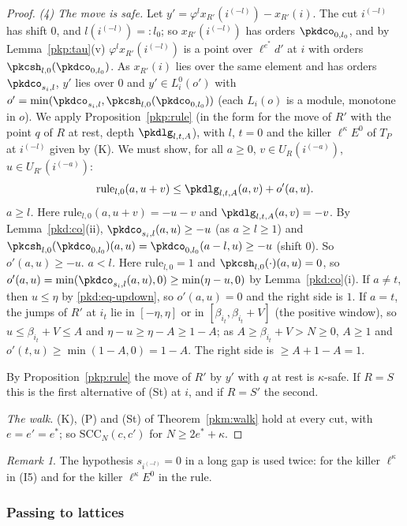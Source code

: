 \documentclass[10pt]{amsart}
\theoremstyle{definition}
\theoremstyle{remark}
\newtheorem{remark}[theorem]{Remark}
\begin{document}
\begin{proof}
\emph{(4) The move is safe.} Let $y'=\varphi^lx_{R'}(i^{(-l)})-x_{R'}(i)$. The cut $i^{(-l)}$ has shift
$0$, and $l(i^{(-l)})=:l_0$; so $x_{R'}(i^{(-l)})$ has orders $\pkdco_{0,l_0}$, and by
Lemma~\ref{pkp:tau}(v) $\varphi^lx_{R'}(i^{(-l)})$ is a point over $\ell^{e^*}d'$ at $i$ with orders
$\pkcsh_{l,0}(\pkdco_{0,l_0})$. As $x_{R'}(i)$ lies over the same element and has orders
$\pkdco_{s_i,l}$, $y'$ lies over $0$ and $y'\in L^0_i(o')$ with
$o'=\min(\pkdco_{s_i,l},\pkcsh_{l,0}(\pkdco_{0,l_0}))$ (each $L_i(o)$ is a module, monotone in $o$). We
apply Proposition~\ref{pkp:rule} (in the form for the move of $R'$ with the point $q$ of $R$ at rest,
depth $\pkdlg_{l,t,A}$), with $l$, $t=0$ and the killer $\ell^\kappa E^0$ of $T_P$ at $i^{(-l)}$
given by (K). We must show, for all $a\ge0$, $v\in U_R(i^{(-a)})$, $u\in U_{R'}(i^{(-a)})$:
\[
\mathrm{rule}_{l,0}(a,u+v)\le\pkdlg_{l,t,A}(a,v)+o'(a,u).
\]
\emph{$a\ge l$.} Here $\mathrm{rule}_{l,0}(a,u+v)=-u-v$ and $\pkdlg_{l,t,A}(a,v)=-v$. By
Lemma~\ref{pkd:co}(ii), $\pkdco_{s_i,l}(a,u)\ge-u$ (as $a\ge l\ge1$) and
$\pkcsh_{l,0}(\pkdco_{0,l_0})(a,u)=\pkdco_{0,l_0}(a-l,u)\ge-u$ (shift $0$). So $o'(a,u)\ge-u$.
\emph{$a<l$.} Here $\mathrm{rule}_{l,0}=1$ and $\pkcsh_{l,0}(\cdot)(a,u)=0$, so
$o'(a,u)=\min(\pkdco_{s_i,l}(a,u),0)\ge\min(\eta-u,0)$ by Lemma~\ref{pkd:co}(i). If $a\ne t$, then
$u\le\eta$ by \eqref{pkd:eq-updown}, so $o'(a,u)=0$ and the right side is $1$. If $a=t$, the jumps of
$R'$ at $i_t$ lie in $[-\eta,\eta]$ or in $[\beta_{i_t},\beta_{i_t}+V]$ (the positive window), so $u\le
\beta_{i_t}+V\le A$ and $\eta-u\ge\eta-A\ge1-A$; as $A\ge\beta_{i_t}+V>N\ge0$, $A\ge1$ and
$o'(t,u)\ge\min(1-A,0)=1-A$. The right side is $\ge A+1-A=1$.

By Proposition~\ref{pkp:rule} the move of $R'$ by $y'$ with $q$ at rest is $\kappa$-safe. If $R=S$
this is the first alternative of (St) at $i$, and if $R=S'$ the second.

\emph{The walk.} (K), (P) and (St) of Theorem~\ref{pkm:walk} hold at every cut, with $e=e'=e^*$; so $\mathrm{SCC}_N(c,c')$ for $N\ge2e^*+\kappa$.
\end{proof}

\begin{remark}
The hypothesis
$s_{i^{(-l)}}=0$ in a long gap is used twice: for the killer $\ell^\kappa$ in (I5) and for the
killer $\ell^\kappa E^0$ in the rule.
\end{remark}

\subsubsection*{Passing to lattices}
\end{document}
